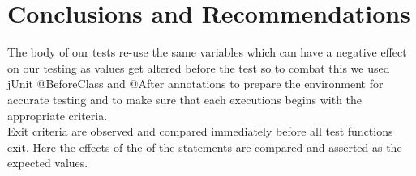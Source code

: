 \documentclass[english]{article}
\begin{document}
		\section{Conclusions and Recommendations}
		The body of our tests re-use the same variables which can have a negative effect on our testing as values get altered before the test so to combat this we used jUnit @BeforeClass and @After annotations to prepare the environment for accurate testing and to make sure that each executions begins with the appropriate criteria.
		\\[4pt]
		Exit criteria are observed and compared immediately before all test functions exit. Here the effects of the of the statements are compared and asserted as the expected values.
		
\end{document}

